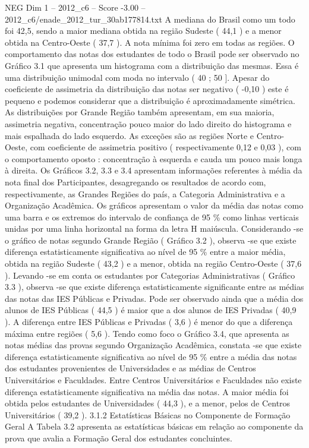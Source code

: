 \begin{textsample}{NEG Dim 1 – 2012\_c6 – Score -3.00 – 2012\_c6/enade\_2012\_tur\_30ab177814.txt}
A mediana do Brasil como um todo foi 42,5, sendo a maior mediana obtida na região Sudeste ( 44,1 ) e a menor obtida na Centro-Oeste ( 37,7 ).
A nota mínima foi zero em todas as regiões.
O comportamento das notas dos estudantes de todo o Brasil pode ser observado no Gráfico 3.1 que apresenta um histograma com a distribuição das mesmas.
Essa é uma distribuição unimodal com moda no intervalo ( 40 ; 50 ].
Apesar do coeficiente de assimetria da distribuição das notas ser negativo ( -0,10 ) este é pequeno e podemos considerar que a distribuição é aproximadamente simétrica.
As distribuições por Grande Região também apresentam, em sua maioria, assimetria negativa, concentração pouco maior do lado direito do histograma e mais espalhada do lado esquerdo.
As exceções são as regiões Norte e Centro-Oeste, com coeficiente de assimetria positivo ( respectivamente 0,12 e 0,03 ), com o comportamento oposto : concentração à esquerda e cauda um pouco mais longa à direita.
Os Gráficos 3.2, 3.3 e 3.4 apresentam informações referentes à média da nota final dos Participantes, desagregando os resultados de acordo com, respectivamente, as Grandes Regiões do país, a Categoria Administrativa e a Organização Acadêmica.
Os gráficos apresentam o valor da média das notas como uma barra e os extremos do intervalo de confiança de 95 \% como linhas verticais unidas por uma linha horizontal na forma da letra H maiúscula.
Considerando -se o gráfico de notas segundo Grande Região ( Gráfico 3.2 ), observa -se que existe diferença estatisticamente significativa ao nível de 95 \% entre a maior média, obtida na região Sudeste ( 43,2 ) e a menor, obtida na região Centro-Oeste ( 37,6 ).
Levando -se em conta os estudantes por Categorias Administrativas ( Gráfico 3.3 ), observa -se que existe diferença estatisticamente significante entre as médias das notas das IES Públicas e Privadas.
Pode ser observado ainda que a média dos alunos de IES Públicas ( 44,5 ) é maior que a dos alunos de IES Privadas ( 40,9 ).
A diferença entre IES Públicas e Privadas ( 3,6 ) é menor do que a diferença máxima entre regiões ( 5,6 ).
Tendo como foco o Gráfico 3.4, que apresenta as notas médias das provas segundo Organização Acadêmica, constata -se que existe diferença estatisticamente significativa ao nível de 95 \% entre a média das notas dos estudantes provenientes de Universidades e as médias de Centros Universitários e Faculdades.
Entre Centros Universitários e Faculdades não existe diferença estatisticamente significativa na média das notas.
A maior média foi obtida pelos estudantes de Universidades ( 44,3 ), e a menor, pelos de Centros Universitários ( 39,2 ). 3.1.2 Estatísticas Básicas no Componente de Formação Geral A Tabela 3.2 apresenta as estatísticas básicas em relação ao componente da prova que avalia a Formação Geral dos estudantes concluintes.

\end{textsample}
